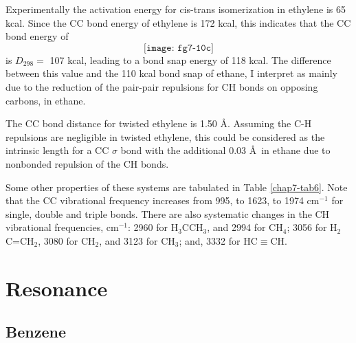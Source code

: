 Experimentally the activation energy for cis-trans isomerization 
in ethylene is 65 kcal.  Since the CC bond energy of ethylene is 172 
kcal, this indicates that the CC bond energy of
\begin{equation}
\texttt{[image: fg7-10c]}
\label{chap7-eqno51}
\end{equation}
is $D_{298} =$ 107 kcal, leading to a bond snap energy of 118 kcal. The 
difference between this value and the 110 kcal bond snap of ethane, 
I interpret as mainly due to the reduction of the pair-pair repulsions 
for CH bonds on opposing carbons, in ethane.

The CC bond distance for twisted ethylene is 1.50 \AA.  Assuming the 
C-H repulsions are negligible in twisted ethylene, this could be 
considered as the intrinsic length for a CC $\sigma$ bond with the 
additional 0.03 \AA\ in ethane due to nonbonded repulsion of the 
CH bonds.

Some other properties of these systems are tabulated in Table
\ref{chap7-tab6}. Note that the CC vibrational frequency increases
from 995, to 1623, to 1974 cm$^{-1}$ for single, double and triple
bonds.  There are also systematic changes in the CH vibrational
frequencies, cm$^{-1}$: 2960 for H$_3$CCH$_3$, and 2994 for CH$_4$;
3056 for H$_2$C=CH$_2$, 3080 for CH$_2$, and 3123 for CH$_3$; and,
3332 for HC$\equiv$CH.

\section{Resonance}

\subsection{Benzene}

